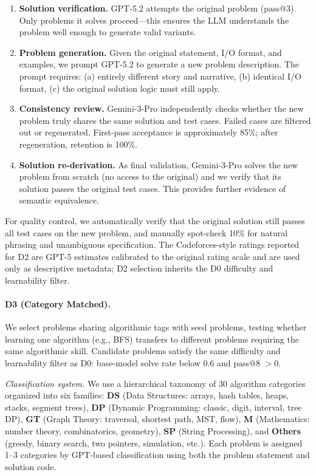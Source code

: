 \documentclass[]{bytedance_seed}
\theoremstyle{plain}
\theoremstyle{definition}
\theoremstyle{remark}
\begin{document}
\begin{enumerate}
    \item \textbf{Solution verification.} GPT-5.2 attempts the original problem (pass@3). Only problems it solves proceed---this ensures the LLM understands the problem well enough to generate valid variants.

    \item \textbf{Problem generation.} Given the original statement, I/O format, and examples, we prompt GPT-5.2 to generate a new problem description. The prompt requires: (a) entirely different story and narrative, (b) identical I/O format, (c) the original solution logic must still apply.

    \item \textbf{Consistency review.} Gemini-3-Pro independently checks whether the new problem truly shares the same solution and test cases. Failed cases are filtered out or regenerated. First-pass acceptance is approximately 85\%; after regeneration, retention is 100\%.

    \item \textbf{Solution re-derivation.} As final validation, Gemini-3-Pro solves the new problem from scratch (no access to the original) and we verify that its solution passes the original test cases. This provides further evidence of semantic equivalence.
\end{enumerate}

For quality control, we automatically verify that the original solution still passes all test cases on the new problem, and manually spot-check 10\% for natural phrasing and unambiguous specification.
The Codeforces-style ratings reported for D2 are GPT-5 estimates calibrated to the original rating scale and are used only as descriptive metadata; D2 selection inherits the D0 difficulty and learnability filter.

\paragraph{D3 (Category Matched).}
We select problems sharing algorithmic tags with seed problems, testing whether learning one algorithm (e.g., BFS) transfers to different problems requiring the same algorithmic skill. Candidate problems satisfy the same difficulty and learnability filter as D0: base-model solve rate below 0.6 and pass@8 $> 0$.

\textit{Classification system.}
We use a hierarchical taxonomy of 30 algorithm categories organized into six families: \textbf{DS} (Data Structures: arrays, hash tables, heaps, stacks, segment trees), \textbf{DP} (Dynamic Programming: classic, digit, interval, tree DP), \textbf{GT} (Graph Theory: traversal, shortest path, MST, flow), \textbf{M} (Mathematics: number theory, combinatorics, geometry), \textbf{SP} (String Processing), and \textbf{Others} (greedy, binary search, two pointers, simulation, etc.). Each problem is assigned 1--3 categories by GPT-based classification using both the problem statement and solution code.
\end{document}
